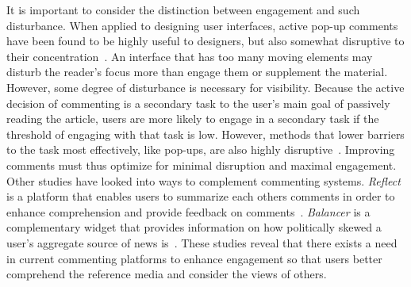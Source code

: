 It is important to consider the distinction between engagement and such disturbance. When applied to designing user interfaces, active pop-up comments have been found to be highly useful to designers, but also somewhat disruptive to their concentration~\cite{CommentingSystems}. An interface that has too many moving elements may disturb the reader's focus more than engage them or supplement the material. However, some degree of disturbance is necessary for visibility. Because the active decision of commenting is a secondary task to the user's main goal of passively reading the article, users are more likely to engage in a secondary task if the threshold of engaging with that task is low. However, methods that lower barriers to the task most effectively, like pop-ups, are also highly disruptive~\cite{Wikipedia}. Improving comments must thus optimize for minimal disruption and maximal engagement.
Other studies have looked into ways to complement commenting systems. \textit{Reflect} is a platform that enables users to summarize each others comments in order to enhance comprehension and provide feedback on comments~\cite{Reflect}. \textit{Balancer} is a complementary widget that provides information on how politically skewed a user's aggregate source of news is~\cite{Politics}. These studies reveal that there exists a need in current commenting platforms to enhance engagement so that users better comprehend the reference media and consider the views of others.
